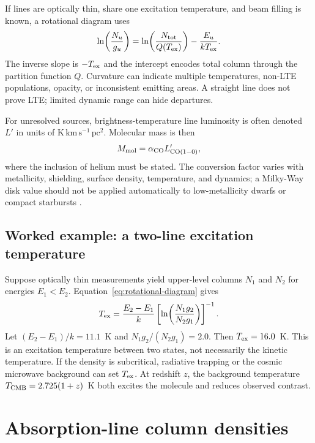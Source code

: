 If lines are optically thin, share one excitation temperature, and beam filling is
known, a rotational diagram uses
\begin{equation}
 \ln\!\left(\frac{N_u}{g_u}\right)
 =\ln\!\left(\frac{N_{\rm tot}}{Q(T_{\rm ex})}\right)
 -\frac{E_u}{kT_{\rm ex}}.
 \label{eq:rotational-diagram}
\end{equation}
The inverse slope is $-T_{\rm ex}$ and the intercept encodes total column through the
partition function $Q$.  Curvature can indicate multiple temperatures, non-LTE
populations, opacity, or inconsistent emitting areas.  A straight line does not prove
LTE; limited dynamic range can hide departures.

For unresolved sources, brightness-temperature line luminosity is often denoted
$L'$ in units of $\mathrm{K\,km\,s^{-1}\,pc^2}$.  Molecular mass is then
\begin{equation}
 M_{\rm mol}=\alpha_{\rm CO}L'_{\rm CO(1-0)},
 \label{eq:alpha-co}
\end{equation}
where the inclusion of helium must be stated.  The conversion factor varies with
metallicity, shielding, surface density, temperature, and dynamics; a Milky-Way disk
value should not be applied automatically to low-metallicity dwarfs or compact
starbursts \citep{BolattoWolfireLeroy2013}.

\subsection{Worked example: a two-line excitation temperature}

Suppose optically thin measurements yield upper-level columns $N_1$ and $N_2$ for
energies $E_1<E_2$.  Equation~\eqref{eq:rotational-diagram} gives
\begin{equation}
 T_{\rm ex}=\frac{E_2-E_1}{k}
 \left[\ln\!\left(\frac{N_1g_2}{N_2g_1}\right)\right]^{-1}.
 \label{eq:two-line-tex}
\end{equation}
Let $(E_2-E_1)/k=11.1$~K and
$N_1g_2/(N_2g_1)=2.0$.  Then $T_{\rm ex}=16.0$~K.  This is an excitation
temperature between two states, not necessarily the kinetic temperature.  If the
density is subcritical, radiative trapping or the cosmic microwave background can
set $T_{\rm ex}$.  At redshift $z$, the background temperature
$T_{\rm CMB}=2.725(1+z)$~K both excites the molecule and reduces observed contrast.

\section{Absorption-line column densities}

